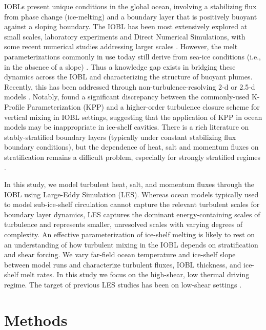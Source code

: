 \documentclass[draft]{agujournal2019}
\begin{document}
IOBLs present unique conditions in the global ocean, involving a stabilizing flux from phase change (ice-melting) and a boundary layer that is positively buoyant against a sloping boundary. The IOBL has been most extensively explored at small scales, laboratory experiments and Direct Numerical Simulations, with some recent numerical studies addressing larger scales \cite{mondal_ablation_2019, vreugdenhil_stratification_2019}. However, the melt parameterizations commonly in use today still derive from sea-ice conditions (i.e., in the absence of a slope) \cite{mcphee_dynamics_1987}. Thus a knowledge gap exists in bridging these dynamics across the IOBL and characterizing the structure of buoyant plumes. Recently, this has been addressed through non-turbulence-resolving 2-d or 2.5-d models \cite{jenkins_simple_2016, jenkins_shear_2021, cheng_modeling_2020}. Notably,  found a significant discrepancy between the commonly-used K-Profile Parameterization (KPP) and a higher-order turbulence closure scheme for vertical mixing in IOBL settings, suggesting that the application of KPP in ocean models may be inappropriate in ice-shelf cavities. 
There is a rich literature on stably-stratified boundary layers (typically under constant stabilizing flux boundary conditions), but the dependence of heat, salt and momentum fluxes on stratification remains a difficult problem, especially for strongly stratified regimes \cite{zonta_stably_2018}. 

In this study, we model turbulent heat, salt, and momentum fluxes through the IOBL using Large-Eddy Simulation (LES). Whereas ocean models typically used to model sub-ice-shelf circulation cannot capture the relevant turbulent scales for boundary layer dynamics, LES captures the dominant energy-containing scales of turbulence and represents smaller, unresolved scales with varying degrees of complexity. An effective parameterization of ice-shelf melting is likely to rest on an understanding of how turbulent mixing in the IOBL depends on stratification and shear forcing. We vary far-field ocean temperature and ice-shelf slope between model runs and characterize turbulent fluxes, IOBL thickness, and ice-shelf melt rates. In this study we focus on the high-shear, low thermal driving regime. The target of previous LES studies has been on low-shear settings \cite{vreugdenhil_stratification_2019}.  

\section{Methods}
\end{document}
